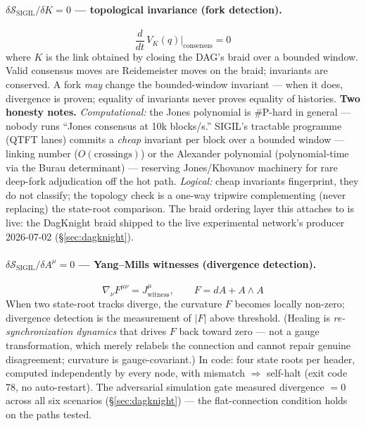 \documentclass[10pt,a4paper]{article}
\newcommand{\SSIGIL}{\mathcal{S}_{\mathrm{SIGIL}}}
\begin{document}
\paragraph{$\delta\SSIGIL/\delta K = 0$ — topological invariance (fork detection).}
\begin{equation}
\frac{d}{dt}\,V_K(q)\Big|_{\mathrm{consensus}} = 0
\end{equation}
where $K$ is the link obtained by closing the DAG's braid over a bounded window. Valid
consensus moves are Reidemeister moves on the braid; invariants are conserved. A fork
\emph{may} change the bounded-window invariant — when it does, divergence is proven;
equality of invariants never proves equality of histories. \textbf{Two honesty notes.}
\emph{Computational:} the Jones polynomial is \#P-hard in general — nobody runs ``Jones
consensus at 10k blocks/s.'' SIGIL's tractable programme (QTFT lanes) commits a
\emph{cheap} invariant per block over a bounded window — linking number
($O(\mathrm{crossings})$) or the Alexander polynomial (polynomial-time via the Burau
determinant) — reserving Jones/Khovanov machinery for rare deep-fork adjudication off
the hot path. \emph{Logical:} cheap invariants fingerprint, they do not classify; the
topology check is a one-way tripwire complementing (never replacing) the state-root
comparison. The braid ordering layer this attaches to is live: the DagKnight braid
shipped to the live experimental network's producer 2026-07-02 (\S\ref{sec:dagknight}).

\paragraph{$\delta\SSIGIL/\delta A^\mu = 0$ — Yang–Mills witnesses (divergence
detection).}
\begin{equation}
\nabla_\nu F^{\mu\nu} = J^\mu_{\mathrm{witness}},\qquad F = dA + A\wedge A
\end{equation}
When two state-root tracks diverge, the curvature $F$ becomes locally non-zero;
divergence detection is the measurement of $|F|$ above threshold. (Healing is
\emph{re-synchronization dynamics} that drives $F$ back toward zero — not a gauge
transformation, which merely relabels the connection and cannot repair genuine
disagreement; curvature is gauge-covariant.) In code: four state roots per header,
computed independently by every node, with mismatch $\Rightarrow$ self-halt (exit code
78, no auto-restart). The adversarial simulation gate measured divergence $=0$ across
all six scenarios (\S\ref{sec:dagknight}) — the flat-connection condition holds on the
paths tested.
\end{document}
